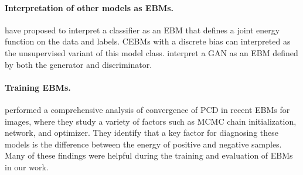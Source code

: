 \documentclass{article}
\begin{document}
\paragraph{Interpretation of other models as EBMs.} \citet{grathwohl2019your,liu2020hybrid} have proposed to interpret a classifier as an EBM that defines a joint energy function on the data and labels. CEBMs with a discrete bias can interpreted as the unsupervised variant of this model class.
\citet{che_your_2020} interpret a GAN as an EBM defined by both the generator and discriminator. 




 





\paragraph{Training EBMs.}  \citet{nijkamp2019anatomy,nijkamp2019learning} performed a comprehensive analysis of convergence of PCD in recent EBMs for images, where they study a variety of factors such as MCMC chain initialization, network, and optimizer. They identify that a key factor for diagnosing these models is the difference between the energy of positive and negative samples. Many of these findings were helpful during the training and evaluation of EBMs in our work. 
\end{document}
